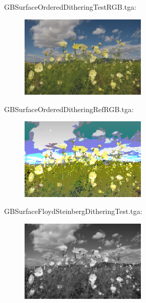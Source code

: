 GBSurfaceOrderedDitheringTestRGB.tga:\\
\begin{center}
\begin{figure}[H]
\centering\includegraphics[width=6cm]{./GBSurfaceOrderedDitheringTestRGB.png}\\
\end{figure}
\end{center}

GBSurfaceOrderedDitheringRefRGB.tga:\\
\begin{center}
\begin{figure}[H]
\centering\includegraphics[width=6cm]{./GBSurfaceOrderedDitheringRefRGB.png}\\
\end{figure}
\end{center}

GBSurfaceFloydSteinbergDitheringTest.tga:\\
\begin{center}
\begin{figure}[H]
\centering\includegraphics[width=6cm]{./GBSurfaceFloydSteinbergDitheringTest.png}\\
\end{figure}
\end{center}

